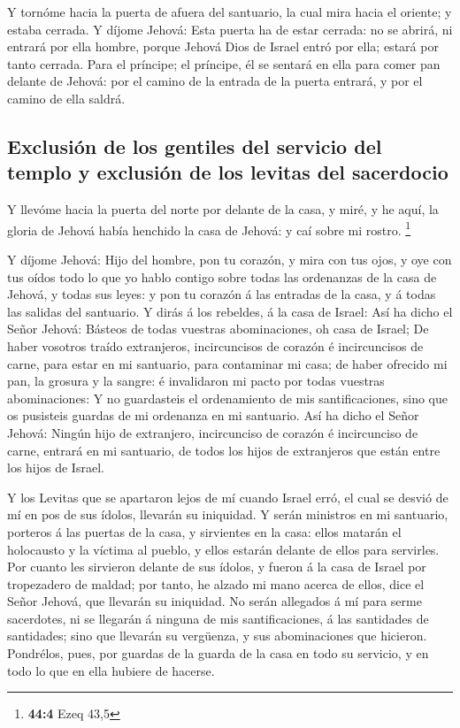  Y tornóme hacia la puerta de afuera del santuario, la cual
mira hacia el oriente; y estaba cerrada.  Y díjome Jehová:
Esta puerta ha de estar cerrada: no se abrirá, ni entrará por ella
hombre, porque Jehová Dios de Israel entró por ella; estará por tanto
cerrada.  Para el príncipe; el príncipe, él se sentará en
ella para comer pan delante de Jehová: por el camino de la entrada de la
puerta entrará, y por el camino de ella saldrá.

\hypertarget{exclusiuxf3n-de-los-gentiles-del-servicio-del-templo-y-exclusiuxf3n-de-los-levitas-del-sacerdocio}{%
\subsection{Exclusión de los gentiles del servicio del templo y
exclusión de los levitas del
sacerdocio}\label{exclusiuxf3n-de-los-gentiles-del-servicio-del-templo-y-exclusiuxf3n-de-los-levitas-del-sacerdocio}}

 Y llevóme hacia la puerta del norte por delante de la casa,
y miré, y he aquí, la gloria de Jehová había henchido la casa de Jehová:
y caí sobre mi rostro. \footnote{\textbf{44:4} Ezeq 43,5}

 Y díjome Jehová: Hijo del hombre, pon tu corazón, y mira
con tus ojos, y oye con tus oídos todo lo que yo hablo contigo sobre
todas las ordenanzas de la casa de Jehová, y todas sus leyes: y pon tu
corazón á las entradas de la casa, y á todas las salidas del santuario.
 Y dirás á los rebeldes, á la casa de Israel: Así ha dicho
el Señor Jehová: Básteos de todas vuestras abominaciones, oh casa de
Israel;  De haber vosotros traído extranjeros, incircuncisos
de corazón é incircuncisos de carne, para estar en mi santuario, para
contaminar mi casa; de haber ofrecido mi pan, la grosura y la sangre: é
invalidaron mi pacto por todas vuestras abominaciones:  Y no
guardasteis el ordenamiento de mis santificaciones, sino que os
pusisteis guardas de mi ordenanza en mi santuario.  Así ha
dicho el Señor Jehová: Ningún hijo de extranjero, incircunciso de
corazón é incircunciso de carne, entrará en mi santuario, de todos los
hijos de extranjeros que están entre los hijos de Israel.

 Y los Levitas que se apartaron lejos de mí cuando Israel
erró, el cual se desvió de mí en pos de sus ídolos, llevarán su
iniquidad.  Y serán ministros en mi santuario, porteros á
las puertas de la casa, y sirvientes en la casa: ellos matarán el
holocausto y la víctima al pueblo, y ellos estarán delante de ellos para
servirles.  Por cuanto les sirvieron delante de sus ídolos,
y fueron á la casa de Israel por tropezadero de maldad; por tanto, he
alzado mi mano acerca de ellos, dice el Señor Jehová, que llevarán su
iniquidad.  No serán allegados á mí para serme sacerdotes,
ni se llegarán á ninguna de mis santificaciones, á las santidades de
santidades; sino que llevarán su vergüenza, y sus abominaciones que
hicieron.  Pondrélos, pues, por guardas de la guarda de la
casa en todo su servicio, y en todo lo que en ella hubiere de hacerse.

